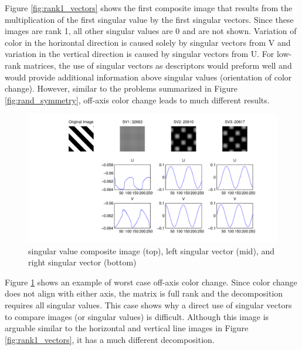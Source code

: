 \documentclass{report}
\begin{document}
Figure \ref{fig:rank1_vectors} shows the first composite image that results from the multiplication of the first singular value by the first singular vectors. Since these images are rank 1, all other singular values are $0$ and are not shown. Variation of color in the horizontal direction is caused solely by singular vectors from V and variation in the vertical direction is caused by singular vectors from U. For low-rank matrices, the use of singular vectors as descriptors would preform well and would provide additional information above singular values (orientation of color change). However, similar to the problems summarized in Figure \ref{fig:rand_symmetry}, off-axis color change leads to much different results.

\begin{figure}[H]
        \centering
        \includegraphics[width=\textwidth]{graphics/singular_vectors_diagonal.pdf}
        \caption{singular value composite image (top), left singular vector (mid), and right singular vector (bottom)}
        \label{fig:diagonal_vectors}
\end{figure}

Figure \ref{fig:diagonal_vectors} shows an example of worst case off-axis color change. Since color change does not align with either axis, the matrix is full rank and the decomposition requires all singular values. This case shows why a direct use of singular vectors to compare images (or singular values) is difficult. Although this image is arguable similar to the horizontal and vertical line images in Figure \ref{fig:rank1_vectors}, it has a much different decomposition.
\end{document}
